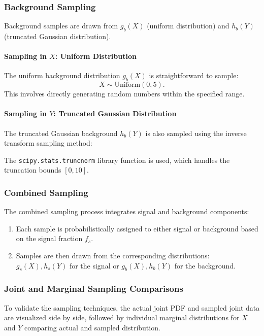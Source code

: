 \documentclass[11pt, a4paper]{article}
\begin{document}
\subsubsection{Background Sampling}

Background samples are drawn from \( g_b(X) \) (uniform distribution) and \( h_b(Y) \) (truncated Gaussian distribution).

\paragraph{Sampling in \( X \): Uniform Distribution}
The uniform background distribution \( g_b(X) \) is straightforward to sample:
\[
X \sim \text{Uniform}(0, 5).
\]
This involves directly generating random numbers within the specified range.

\paragraph{Sampling in \( Y \): Truncated Gaussian Distribution}
The truncated Gaussian background \( h_b(Y) \) is also sampled using the inverse transform sampling method:

The \texttt{scipy.stats.truncnorm} library function is used, which  handles the truncation bounds \([0, 10]\).



\subsubsection{Combined Sampling}
The combined sampling process integrates signal and background components:
\begin{enumerate}
    \item Each sample is probabilistically assigned to either signal or background based on the signal fraction \( f_s \).
    \item Samples are then drawn from the corresponding distributions: \( g_s(X), h_s(Y) \) for the signal or \( g_b(X), h_b(Y) \) for the background.
\end{enumerate}

\subsubsection{Joint and Marginal Sampling Comparisons}

To validate the sampling techniques, the actual joint PDF and sampled joint data are visualized side by side, followed by individual marginal distributions for \( X \) and \( Y \) comparing actual and sampled distribution.
\end{document}
